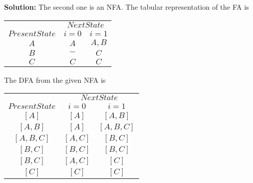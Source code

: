 \documentclass[a4,9pt]{beamer}
\begin{document}
\begin{frame}
\textbf{Solution:} The second one is an NFA. The tabular representation of the FA is

\vspace*{0.4cm}
\begin{center}
\begin{tabular}{ccc}
 \hline

 \hline

 \hline

 \hline
 & \multicolumn{2}{c}{$Next State$}\\
 \cline{2-3}
 $Present State$ &  $i=0$ & $i=1$\\
\hline
 $A$   &   $A$      &  $A,B$ \\
 $B$   &   $-$      &  $C$   \\
 $C$   &   $C$      &  $C$   \\
 \hline

 \hline

 \hline

 \hline
\end{tabular}
\end{center}
\end{frame}

\begin{frame}
The DFA from the given NFA is

\vspace*{0.4cm}
\begin{center}
\begin{tabular}{ccc}
 \hline

 \hline

 \hline

 \hline
 & \multicolumn{2}{c}{$Next State$}\\
 \cline{2-3}
 $Present State$ &  $i=0$ & $i=1$\\
\hline
     $[A]$     &    $[A]$   &    $[A, B]$  \\
   $[A, B]$    &    $[A]$   &  $[A, B, C]$ \\
 $[A, B, C]$   &  $[A, C]$  &   $[B, C]$   \\
  $[B, C]$     &  $[B, C]$  &   $[B, C]$   \\
 $[B, C]$      &  $[A, C]$  &    $[C]$    \\
  $[C]$        &   $[C]$    &    $[C]$    \\

\end{tabular}
\end{center}
\end{frame}
\end{document}
